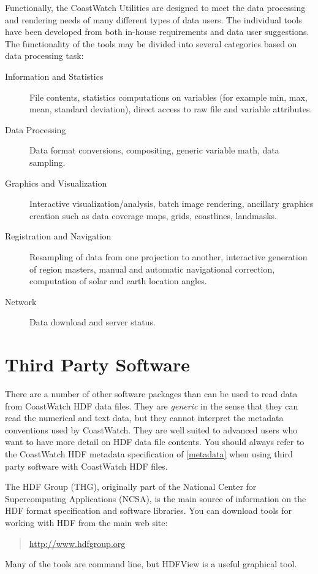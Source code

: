 Functionally, the CoastWatch Utilities are designed to meet the data
processing and rendering needs of many different types of data users.
The individual tools have been developed from both in-house
requirements and data user suggestions.  The functionality of the
tools may be divided into several categories based on data processing
task:
\begin{description}

  \item[Information and Statistics] File contents, statistics
  computations on variables (for example min, max, mean, standard
  deviation), direct access to raw file and variable attributes.

  \item[Data Processing] Data format conversions,
  compositing, generic variable math, data sampling.

  \item[Graphics and Visualization] Interactive
  visualization/analysis, batch image rendering, ancillary graphics
  creation such as data coverage maps, grids, coastlines, landmasks.
    
  \item[Registration and Navigation] Resampling of data from one
  projection to another, interactive generation of region masters,
  manual and automatic navigational correction, computation of solar
  and earth location angles.

  \item[Network] Data download and server status.

\end{description}

\section{Third Party Software}
\label{third}

There are a number of other software packages than can
be used to read data from CoastWatch HDF data files.  They are {\em
generic} in the sense that they can read the numerical and text data,
but they cannot interpret the metadata conventions used by CoastWatch.
They are well suited to advanced users who want to have more detail on
HDF data file contents.  You should always refer to the CoastWatch
HDF metadata specification of \autoref{metadata} when using third
party software with CoastWatch HDF files.

The HDF Group (THG), originally part of the National Center for
Supercomputing Applications (NCSA), is the main source of information
on the HDF format specification and software libraries.  You can
download tools for working with HDF from the main web site:
\begin{quote}
  \url{http://www.hdfgroup.org}
\end{quote} 
Many of the tools are command line, but HDFView is a useful graphical
tool.

